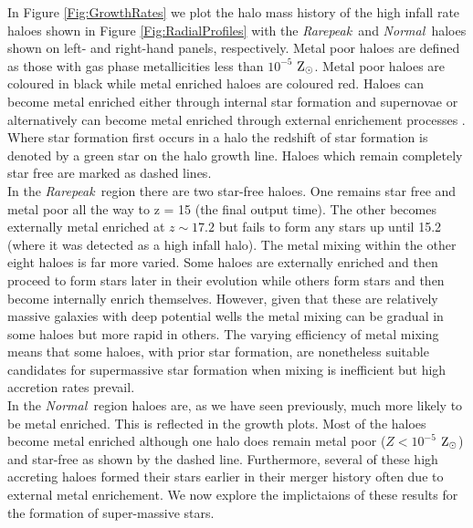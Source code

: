 \documentclass[graphics, twocolumn, usenatbib]{mn2e}
\newcommand{\zsolarc} {$\rm{Z_{\odot}}$}
\newcommand{\rarepeak} {\textit{Rarepeak~}}
\newcommand{\normal} {\textit{Normal~}}
\begin{document}
\indent In Figure \ref{Fig:GrowthRates} we plot the halo mass history of the high infall
rate haloes shown in Figure \ref{Fig:RadialProfiles} with the \rarepeak and \normal haloes
shown on left- and right-hand panels, respectively. 
Metal poor haloes are defined as those with gas phase metallicities less than
$10^{-5}$ \zsolarc. Metal poor haloes are coloured in black while metal enriched haloes are coloured
red. Haloes can become metal enriched either through internal star formation and supernovae or
alternatively can become metal enriched through external enrichement processes
\citep[e.g.][]{Smith_2015}. Where star formation first
occurs in a halo the redshift of star formation is denoted by a green star on the halo growth line. 
Haloes which remain completely star free are marked as dashed lines. \\
\indent In the \rarepeak region there are two
star-free haloes. One remains star free and metal poor all the way to z = 15 (the final output time).
The other becomes externally metal enriched at $z \sim 17.2$ but fails to form any stars up until 15.2
(where it was detected as a high infall halo). The metal mixing within the other eight haloes is far
more varied. Some haloes are externally enriched and then proceed to form stars later in their
evolution while others form stars and then become internally enrich themselves. 
However, given that these are relatively massive galaxies with deep potential wells
the metal mixing can be gradual in some haloes but more rapid in others. The varying efficiency of
metal mixing means that some haloes, with prior star formation, are nonetheless suitable candidates
for supermassive star formation when mixing is inefficient but high accretion rates prevail. \\
\indent In the \normal region haloes are, as we have seen previously, much more likely to be
metal enriched. This is reflected in the growth plots. Most of the haloes become metal enriched
although one halo does remain metal poor ($Z < 10^{-5}$ \zsolarc) and star-free as shown by the dashed
line. Furthermore, several of these high accreting haloes formed their stars earlier in their merger
history often due to external metal enrichement. We now explore the implictaions of these results for
the formation of super-massive stars. 
\end{document}
